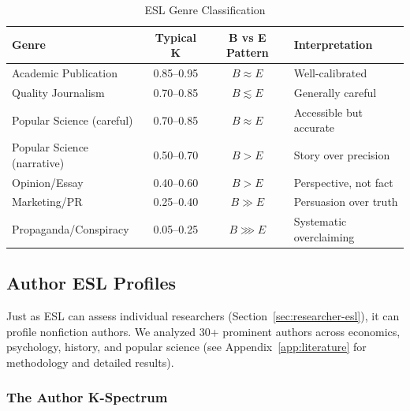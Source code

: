 \documentclass[11pt,a4paper]{article}
\begin{document}
\begin{table}[h]
\centering
\caption{ESL Genre Classification}
\label{tab:genre-classification}
\begin{tabular}{lccl}
\toprule
\textbf{Genre} & \textbf{Typical K} & \textbf{B vs E Pattern} & \textbf{Interpretation} \\
\midrule
Academic Publication & 0.85--0.95 & $B \approx E$ & Well-calibrated \\
Quality Journalism & 0.70--0.85 & $B \lesssim E$ & Generally careful \\
Popular Science (careful) & 0.70--0.85 & $B \approx E$ & Accessible but accurate \\
Popular Science (narrative) & 0.50--0.70 & $B > E$ & Story over precision \\
Opinion/Essay & 0.40--0.60 & $B > E$ & Perspective, not fact \\
Marketing/PR & 0.25--0.40 & $B \gg E$ & Persuasion over truth \\
Propaganda/Conspiracy & 0.05--0.25 & $B \ggg E$ & Systematic overclaiming \\
\bottomrule
\end{tabular}
\end{table}

\subsection{Author ESL Profiles}

Just as ESL can assess individual researchers (Section~\ref{sec:researcher-esl}), it can profile nonfiction authors. We analyzed 30+ prominent authors across economics, psychology, history, and popular science (see Appendix~\ref{app:literature} for methodology and detailed results).

\subsubsection{The Author K-Spectrum}
\end{document}
